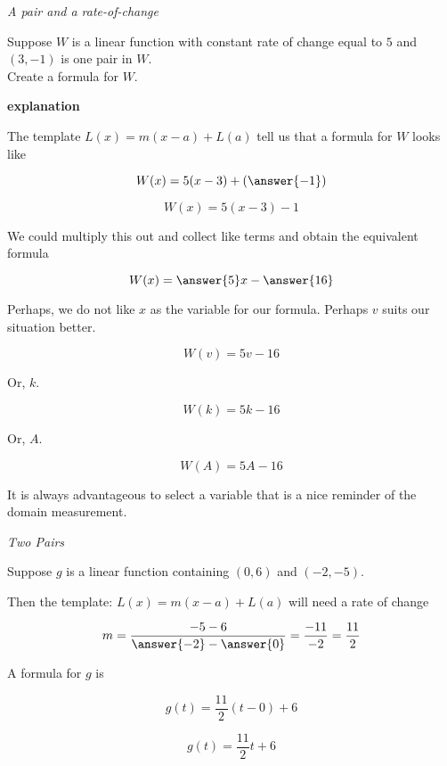 \documentclass{ximera}
\begin{document}
\begin{example} \textit{A pair and a rate-of-change}


Suppose $W$ is a linear function with constant rate of change equal to $5$ and $(3, -1)$ is one pair in $W$.  \\

Create a formula for $W$.

\textbf{\textcolor{red!75!green}{explanation}} 



The template $L(x) = m (x-a) + L(a)$ tell us that a formula for $W$ looks like 


\[  W(x) = 5 (x-3) + \left(\answer{-1}\right)     \]


\[  W(x) = 5 (x-3) - 1     \]

We could multiply this out and collect like terms and obtain the equivalent formula


\[  W(x) = \answer{5}x - \answer{16}   \]



Perhaps, we do not like $x$ as the variable for our formula.  Perhaps $v$ suits our situation better.

\[  W(v) = 5v - 16   \]


Or, $k$.

\[  W(k) = 5k - 16   \]


Or, $A$.

\[  W(A) = 5A - 16   \]


It is always advantageous to select a variable that is a nice reminder of the domain measurement.

\end{example}









\begin{example} \textit{Two Pairs}


Suppose $g$ is a linear function containing $(0, 6)$ and $(-2, -5)$.

Then the template: $L(x) = m (x-a) + L(a)$ will need a rate of change



\[  m = \frac{-5 - 6}{\answer{-2} - \answer{0}} = \frac{-11}{-2} = \frac{11}{2}  \]

A formula for $g$ is


\[  g(t) = \frac{11}{2} (t-0) + 6     \]


\[  g(t) = \frac{11}{2} t + 6    \]



\end{example}
\end{document}

